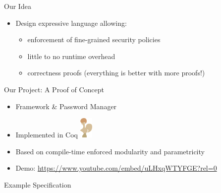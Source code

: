 \documentclass{beamer}
\newcommand{\fullwidth}[1]{\noindent\checkoddpage\makebox[0pt][r]{\makebox[\dimexpr1in+\hoffset+\ifoddpage\oddsidemargin\else\evensidemargin\fi][l]{#1}}}
\newcommand{\truecenter}[1]{\fullwidth{\parbox[c]{\paperwidth}{#1}}}
\def\untrusted#1{\save[].[#1]*[F]\frm{}\restore}
\def\trusted#1{\save[].[#1]*[F=]\frm{}\restore}
\begin{document}
\begin{frame}{\Huge Our Idea}
\Large
\begin{itemize}
  \item Design expressive language allowing:
  \begin{itemize}\Large
    \item enforcement of fine-grained security policies
    \item little to no runtime overhead \pause
    \item correctness proofs \small (everything is better with more proofs!)
  \end{itemize}
\end{itemize}
\end{frame}



\begin{frame}{\Huge Our Project: A Proof of Concept}
\Large
\begin{itemize}
  \item Framework \& Password Manager
  \item Implemented in Coq \includegraphics[width=0.05\textwidth]{coq-logo}
  \item Based on compile-time enforced modularity and parametricity
  \item Demo: \url{https://www.youtube.com/embed/uLHxqWTYFGE?rel=0}
\end{itemize}
\end{frame}



\begin{frame}{\Huge Example Specification}
\Large
\vspace{-0.2in}
\truecenter{%
\[
\xymatrix@-0.5pc{
&\trusted{ddddddrrrr} \\
&&\untrusted{dddd}\txt{\phantom{UI}}& \txt{\phantom{Encrypt}} & \untrusted{dddd}\txt{\phantom{Net}}&& \\
&&\txt{\phantom{UI}}\ar[r]& \trusted{}\txt{\textbf{Encrypt}}\ar[r]     &                 \txt{\phantom{Net}}\ar@{=>}[rrr]^>{\txt{Network Out}}&&& \\
\ar@{=>}[rr]^<{\txt{User In\ \ \phantom{.}}}&&\txt{UI}&  \ar[u]\ar[d]\trusted{}\txt{\textbf{Secret Key}}     &                 \txt{Net}& \\
&&\txt{\phantom{UI}}&  \ar[l]\untrusted{}\txt{Decrypt}     & \ar[l] \txt{\phantom{Net}}&&&\ar@{=>}[lll]^<{\txt{Network In}} \\
&&\txt{\phantom{UI}}& \txt{\phantom{Encrypt}} & \txt{\phantom{Net}}&& \\
&&\txt{\phantom{UI}}& \txt{\phantom{Encrypt}} & \txt{\phantom{Net}}&& \\
}
\]
}
\end{frame}
\end{document}
